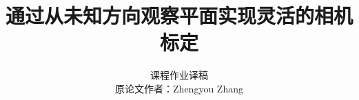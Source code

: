 \documentclass[UTF8,a4paper,10pt,fontset=fandol]{ctexart}
\title{\heiti 通过从未知方向观察平面实现灵活的相机标定}
\author{课程作业译稿\\[-0.25em]\small 原论文作者：Zhengyou Zhang}
\date{}
\begin{document}
\maketitle

\nocite{%
  bougnoux1998projective,
  brown1971close,
  caprile1990vanishing,
  faig1975calibration,
  faugeras1993three,
  faugeras1992self,
  faugeras1986stereo,
  ganapathy1984decomposition,
  gennery1979stereo,
  hartley1994rotating,
  hartley1995defence,
  hartley1994several,
  liebowitz1998metric,
  luong1997self,
  maybank1992theory,
  more1977levenberg,
  slama1980manual,
  stein1995accurate,
  triggs1998autocalibration,
  tsai1987versatile,
  wei1993complete,
  wei1994implicit,
  weng1992camera,
  zhang1998flexible%
}












\end{document}
